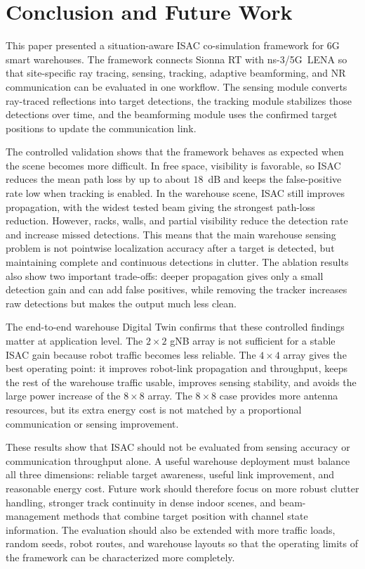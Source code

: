 \section{Conclusion and Future Work}
\label{sec:conclusion}

This paper presented a situation-aware ISAC co-simulation framework for 6G
smart warehouses. The framework connects Sionna RT with ns-3/5G~LENA so that
site-specific ray tracing, sensing, tracking, adaptive beamforming, and NR
communication can be evaluated in one workflow. The sensing module converts
ray-traced reflections into target detections, the tracking module stabilizes
those detections over time, and the beamforming module uses the confirmed
target positions to update the communication link.

The controlled validation shows that the framework behaves as expected when
the scene becomes more difficult. In free space, visibility is favorable, so
ISAC reduces the mean path loss by up to about $18$~dB and keeps the
false-positive rate low when tracking is enabled. In the warehouse scene, ISAC
still improves propagation, with the widest tested beam giving the strongest
path-loss reduction. However, racks, walls, and partial visibility reduce the
detection rate and increase missed detections. This means that the main
warehouse sensing problem is not pointwise localization accuracy after a target
is detected, but maintaining complete and continuous detections in clutter. The
ablation results also show two important trade-offs: deeper propagation gives
only a small detection gain and can add false positives, while removing the
tracker increases raw detections but makes the output much less clean.

The end-to-end warehouse Digital Twin confirms that these controlled findings
matter at application level. The $2{\times}2$ gNB array is not sufficient for a
stable ISAC gain because robot traffic becomes less reliable. The $4{\times}4$
array gives the best operating point: it improves robot-link propagation and
throughput, keeps the rest of the warehouse traffic usable, improves sensing
stability, and avoids the large power increase of the $8{\times}8$ array. The
$8{\times}8$ case provides more antenna resources, but its extra energy cost is
not matched by a proportional communication or sensing improvement.

These results show that ISAC should not be evaluated from sensing accuracy or
communication throughput alone. A useful warehouse deployment must balance all
three dimensions: reliable target awareness, useful link improvement, and
reasonable energy cost. Future work should therefore focus on more robust
clutter handling, stronger track continuity in dense indoor scenes, and
beam-management methods that combine target position with channel state
information. The evaluation should also be extended with more traffic loads,
random seeds, robot routes, and warehouse layouts so that the operating limits
of the framework can be characterized more completely.
